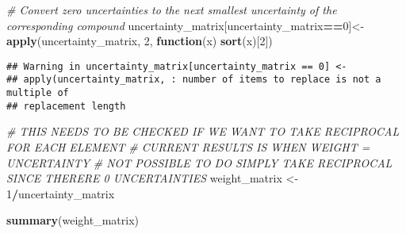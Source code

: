 \documentclass[
]{article}
\newenvironment{Shaded}{\begin{snugshade}}{\end{snugshade}}
\newcommand{\CommentTok}[1]{\textcolor[rgb]{0.56,0.35,0.01}{\textit{#1}}}
\newcommand{\ControlFlowTok}[1]{\textcolor[rgb]{0.13,0.29,0.53}{\textbf{#1}}}
\newcommand{\DecValTok}[1]{\textcolor[rgb]{0.00,0.00,0.81}{#1}}
\newcommand{\FunctionTok}[1]{\textcolor[rgb]{0.13,0.29,0.53}{\textbf{#1}}}
\newcommand{\NormalTok}[1]{#1}
\newcommand{\OtherTok}[1]{\textcolor[rgb]{0.56,0.35,0.01}{#1}}
\newcommand{\SpecialCharTok}[1]{\textcolor[rgb]{0.81,0.36,0.00}{\textbf{#1}}}
\begin{document}
\begin{Shaded}
\begin{Highlighting}[]
\CommentTok{\# Convert zero uncertainties to the next smallest uncertainty of the corresponding compound}
\NormalTok{uncertainty\_matrix[uncertainty\_matrix}\SpecialCharTok{==}\DecValTok{0}\NormalTok{]}\OtherTok{\textless{}{-}}\FunctionTok{apply}\NormalTok{(uncertainty\_matrix, }\DecValTok{2}\NormalTok{, }\ControlFlowTok{function}\NormalTok{(x) }\FunctionTok{sort}\NormalTok{(x)[}\DecValTok{2}\NormalTok{])}
\end{Highlighting}
\end{Shaded}

\begin{verbatim}
## Warning in uncertainty_matrix[uncertainty_matrix == 0] <-
## apply(uncertainty_matrix, : number of items to replace is not a multiple of
## replacement length
\end{verbatim}

\begin{Shaded}
\begin{Highlighting}[]
\CommentTok{\# THIS NEEDS TO BE CHECKED IF WE WANT TO TAKE RECIPROCAL FOR EACH ELEMENT}
\CommentTok{\# CURRENT RESULTS IS WHEN WEIGHT = UNCERTAINTY}
\CommentTok{\# NOT POSSIBLE TO DO SIMPLY TAKE RECIPROCAL SINCE THERE\textquotesingle{}RE 0 UNCERTAINTIES}
\NormalTok{weight\_matrix }\OtherTok{\textless{}{-}} \DecValTok{1}\SpecialCharTok{/}\NormalTok{uncertainty\_matrix }

\FunctionTok{summary}\NormalTok{(weight\_matrix)}
\end{Highlighting}
\end{Shaded}
\end{document}
